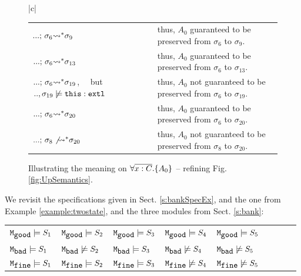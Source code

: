  \begin{figure}[htb]
\begin{tabular}{|c|}
\hline  %
\\
\hline
\begin{tabular}{lcl}
$\leadstoBoundedStar {...} {\sigma_6}   {\sigma_9} $ & & thus, $A_0$ guaranteed to be preserved from $\sigma_6$ to $\sigma_9$.\\
$\leadstoBoundedStar {...} {\sigma_6}   {\sigma_{13}} $ & & thus, $A_0$ guaranteed to be preserved from $\sigma_6$ to $\sigma_{13}$.\\
$\leadstoBoundedStar {...} {\sigma_6}   {\sigma_{19}} $, \ \  but $..,\sigma_{19}\not \models {\external{\prg{this}}}$ & & thus, $A_0$ not guaranteed to be preserved from $\sigma_6$ to $\sigma_{19}$.\\
$\leadstoBoundedStar {...} {\sigma_6}  {\sigma_{20}} $  \ \   & & thus, $A_0$  guaranteed to be preserved from $\sigma_6$ to $\sigma_{20}$.\\
$\notLeadstoBoundedStar {...} {\sigma_8}  {\sigma_{20}} $  \ \   & & thus, $A_0$  not guaranteed to be preserved from $\sigma_8$ to $\sigma_{20}$.\\
\hline
\end{tabular}
\end{tabular}
   \caption{Illustrating  the meaning on ${\TwoStatesN {\overline {x:C}} {A_0}}$  -- refining Fig. \ref{fig:UpSemantics}. }
      \label{fig:illusrPreserve} 
 \end{figure}
 
 \begin{example}
 \label{example:twostatesarisfy}
 {We   revisit the specifications given in Sect. \ref{s:bankSpecEx}, and the one from Example \ref{example:twostate}, and  the three  modules from Sect. \ref{s:bank}:}


\begin{tabular}{lllllllll}
$\ModA  \models S_1$  &   $\ModA  \models S_2$ &  $\ModA \models S_3$ &   $\ModA \models S_4$    & $\ModA \models S_5$\\
 $\ModB \models S_1$  &   $\ModB \not\models S_2$   &  $\ModB  \models S_3$   &  $\ModB  \not\models S_4$   & $\ModB \not\models S_5$ \\
 $\ModC  \models S_1$    & $\ModC \models S_2$ &   $\ModC \models S_3$    &$\ModC \not\models S_4$   & $\ModC \not\models S_5$ 
\end{tabular}
\end{example}
 


